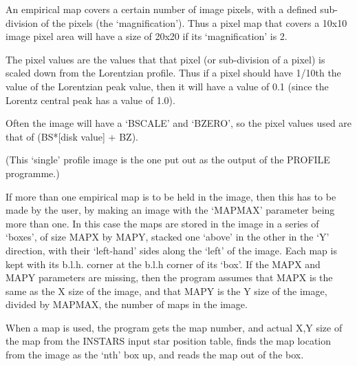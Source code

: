 \begin{small}
{{  An empirical map covers a certain number of image pixels, with
  a defined sub-division of the pixels (the `magnification'). Thus
  a pixel map that covers a 10x10 image pixel area will have a
  size of 20x20 if its `magnification' is 2.
 
  The pixel values are the values that that pixel (or sub-division of
  a pixel) is scaled down from the Lorentzian profile. Thus if a
  pixel should have 1/10th the value of the Lorentzian peak value,
  then it will have a value of 0.1 (since the Lorentz central peak
  has a value of 1.0).
 
  Often the image will have a `BSCALE' and `BZERO', so the pixel
  values used are  that of (BS*[disk value] + BZ).
 
  (This `single' profile image is the one put out as the output of the
  PROFILE programme.)
 
  If more than one empirical map is to be held in the image, then
  this has to be made by the user, by making an image with the `MAPMAX'
  parameter being more than one. In this case the maps are stored in
  the image in a series of `boxes', of size MAPX by MAPY, stacked one
  `above' in the other in the `Y' direction, with their `left-hand' sides
  along the `left' of the image. Each map is kept with its
  b.l.h. corner at the b.l.h corner of its `box'. If the MAPX and
  MAPY parameters are missing, then the program assumes that MAPX is
  the same as the X size of the image, and that MAPY is the Y size
  of the image, divided by MAPMAX, the number of maps in the image.
 
  When a map is used, the program gets the map number, and actual
  X,Y size of the map from the INSTARS input star position table,
  finds the map location from the image as the `nth' box up, and
  reads the map out of the box.
 
 
}}
\end{small}
